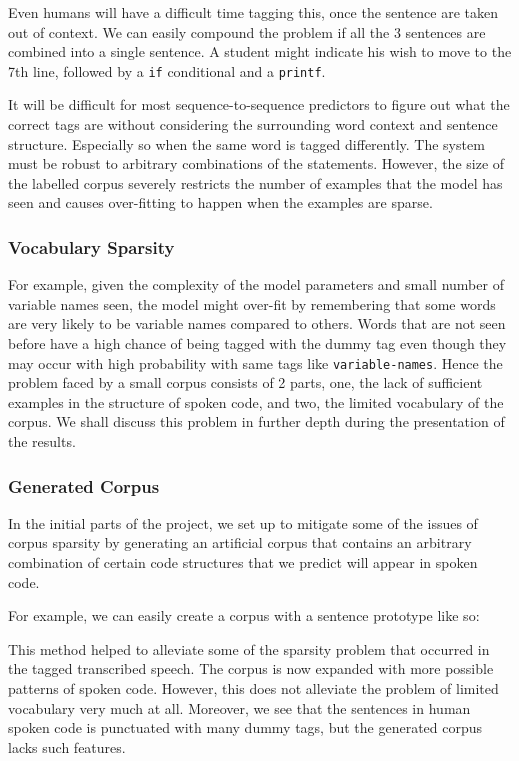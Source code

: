 \documentclass[fyp]{socreport}
\begin{document}
Even humans will have a difficult time tagging this, once the sentence are
taken out of context. We can easily compound the problem if all the 3 sentences
are combined into a single sentence. A student might indicate his wish to move
to the 7th line, followed by a \texttt{if} conditional and a \texttt{printf}.

It will be difficult for most sequence-to-sequence predictors to figure out
what the correct tags are without considering the surrounding word context and
sentence structure. Especially so when the same word is tagged differently. The
system must be robust to arbitrary combinations of the statements. However, the
size of the labelled corpus severely restricts the number of examples that the
model has seen and causes over-fitting to happen when the examples are sparse.

\subsubsection{Vocabulary Sparsity} For example, given the complexity of the
model parameters and small number of variable names seen, the model might
over-fit by remembering that some words are very likely to be variable names
compared to others. Words that are not seen before have a high chance of being
tagged with the dummy tag even though they may occur with high probability with
same tags like \texttt{variable-names}. Hence the problem faced by a small
corpus consists of 2 parts, one, the lack of sufficient examples in the
structure of spoken code, and two, the limited vocabulary of the corpus.  We
shall discuss this problem in further depth during the presentation of the
results.

\subsubsection{Generated Corpus}
In the initial parts of the project, we set up to mitigate some of the issues
of corpus sparsity by generating an artificial corpus that contains an arbitrary
combination of certain code structures that we predict will appear in spoken code.

For example, we can easily create a corpus with a sentence prototype like so:

\hspace{20pt}
   

This method helped to alleviate some of the sparsity problem that occurred in
the tagged transcribed speech. The corpus is now expanded with more possible
patterns of spoken code. However, this does not alleviate the problem of limited
vocabulary very much at all. Moreover, we see that the sentences in human spoken
code is punctuated with many dummy tags, but the generated corpus lacks such
features.
\end{document}
